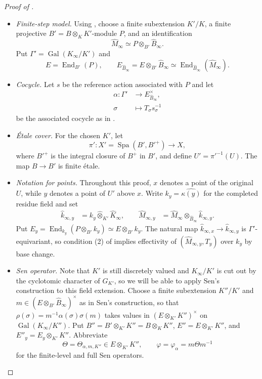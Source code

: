 \documentclass[10pt,twoside]{article}
\numberwithin{equation}{section}
\theoremstyle{plain}
\theoremstyle{definition}
\DeclareMathOperator{\Spa}{Spa}
\DeclareMathOperator{\End}{End}
\DeclareMathOperator{\Gal}{Gal}
\let \phi \varphi
\begin{document}
\begin{proof}[Proof of ]
\begin{itemize}
\item \emph{Finite-step model.} Using , choose a finite subextension \(K'/K\), a finite projective \(B'=B\otimes_K K'\)-module \(P\), and an identification
\[
\hat M_\infty\simeq P\otimes_{B'}\hat B_\infty.
\]
Put \(\Gamma'=\Gal(K_\infty/K')\) and
\[
E=\End_{B'}(P),\qquad
E_{\hat B_\infty}=E\otimes_{B'}\hat B_\infty
\simeq\End_{\hat B_\infty}(\hat M_\infty).
\]
\item \emph{Cocycle.}
Let \(s\) be the reference action associated with \(P\) and let
\begin{align*}
\alpha\colon\Gamma'&\longrightarrow E_{\hat B_\infty}^\times,\\
\sigma&\mapsto T_\sigma s_\sigma^{-1}
\end{align*}
be the associated cocycle as in .
\item \emph{\'{E}tale cover.} For the chosen \(K'\), let
\[
\pi'\colon X'=\Spa(B',B'^+)\longrightarrow X,
\]
where \(B'^+\) is the integral closure of \(B^+\) in \(B'\), and define \(U'=\pi'^{-1}(U)\).
The map \(B\to B'\) is finite \'{e}tale.
\item \emph{Notation for points.} Throughout this proof, \(x\) denotes a point of the original \(U\), while \(y\) denotes a point of \(U'\) above \(x\). Write \(k_y=\widehat{\kappa(y)}\) for the completed residue field and set
\begin{align*}
\hat k_{\infty, y}&=k_y\widehat\otimes_{K'}\hat K_\infty,\qquad
\hat M_{\infty, y}&=\hat M_\infty\otimes_{\hat B_\infty}\hat k_{\infty, y}.
\end{align*}
Put \(E_y=\End_{k_y}(P\otimes_{B'}k_y)\simeq E\otimes_{B'}k_y\). The natural map \(\hat k_{\infty,x}\to\hat k_{\infty,y}\) is \(\Gamma'\)-equivariant, so condition (2) of  implies effectivity of \((\hat M_{\infty,y},T_y)\) over \(k_y\) by base change.
\item \emph{Sen operator.}
Note that \(K'\) is still discretely valued and \(K_\infty/K'\) is cut out by the cyclotomic character of \(G_{K'}\), so we will be able to apply Sen's construction to this field extension.
Choose a finite subextension \(K''/K'\) and \(m\in(E\otimes_{B'}\hat B_\infty)^\times\) as in Sen's construction, so that \(\rho(\sigma)=m^{-1}\alpha(\sigma)\sigma(m)\) takes values in \((E\otimes_{K'}K'')^\times\) on \(\Gal(K_\infty/K'')\). Put \(B''=B'\otimes_{K'}K''=B\otimes_K K''\), \(E''=E\otimes_{K'}K''\), and \(E''_y=E_y\otimes_{K'}K''\). Abbreviate
\[
\Theta=\Theta_{\alpha,m,K''}\in E\otimes_{K'}K'',\qquad
\phi=\phi_\alpha=m\Theta m^{-1}
\]
for the finite-level and full Sen operators.
\end{itemize}


\end{proof}
\end{document}
